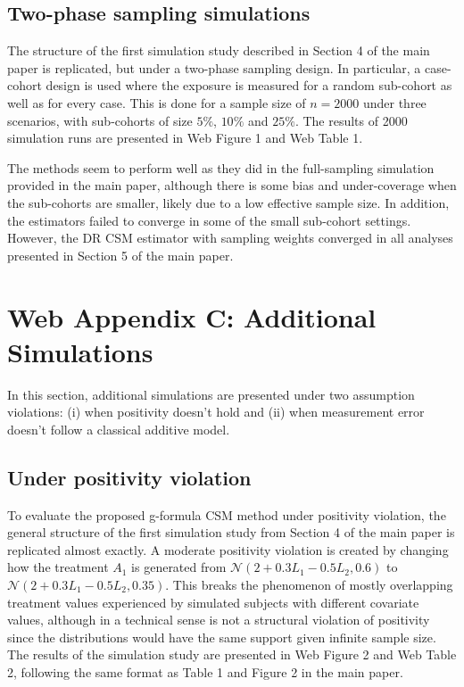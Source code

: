 \documentclass[12pt]{article}
\begin{document}
\subsection{Two-phase sampling simulations}

The structure of the first simulation study described in Section 4 of the main paper is replicated, but under a two-phase sampling design. In particular, a case-cohort design is used where the exposure is measured for a random sub-cohort as well as for every case. This is done for a sample size of $n=2000$ under three scenarios, with sub-cohorts of size $5\%$, $10\%$ and $25\%$. The results of 2000 simulation runs are presented in Web Figure 1 and Web Table 1.

The methods seem to perform well as they did in the full-sampling simulation provided in the main paper, although there is some bias and under-coverage when the sub-cohorts are smaller, likely due to a low effective sample size. In addition, the estimators failed to converge in some of the small sub-cohort settings. However, the DR CSM estimator with sampling weights converged in all analyses presented in Section 5 of the main paper.

\section{Web Appendix C: Additional Simulations}

In this section, additional simulations are presented under two assumption violations: (i) when positivity doesn't hold and (ii) when measurement error doesn't follow a classical additive model.

\subsection{Under positivity violation}

To evaluate the proposed g-formula CSM method under positivity violation, the general structure of the first simulation study from Section 4 of the main paper is replicated almost exactly. A moderate positivity violation is created by changing how the treatment $A_{1}$ is generated from $\mathcal{N}(2 + 0.3L_{1} - 0.5L_{2}, 0.6)$ to $\mathcal{N}(2 + 0.3L_{1} - 0.5L_{2}, 0.35)$. This breaks the phenomenon of mostly overlapping treatment values experienced by simulated subjects with different covariate values, although in a technical sense is not a structural violation of positivity since the distributions would have the same support given infinite sample size. The results of the simulation study are presented in Web Figure 2 and Web Table 2, following the same format as Table 1 and Figure 2 in the main paper.
\end{document}
